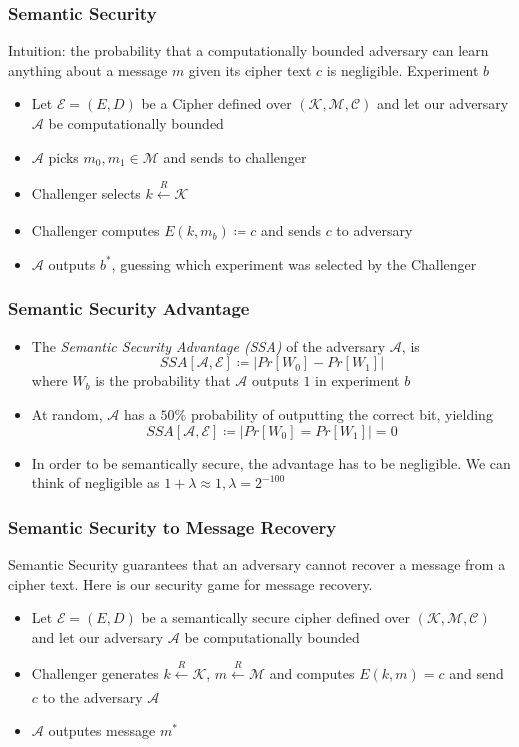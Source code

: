 \documentclass{beamer}
\begin{document}
\begin{frame}
\frametitle{Semantic Security}
    Intuition: the probability that a computationally bounded adversary can learn anything about a message \(m\) given its cipher text \(c\) is negligible. \pause
    Experiment \(b\)
    \begin{itemize}
        \item Let \(\mathcal{E} = (E, D)\) be a Cipher defined over \((\mathcal{K}, \mathcal{M}, \mathcal{C})\) and let our adversary \(\mathcal{A}\) be computationally bounded \pause
        \item \(\mathcal{A}\) picks \(m_0, m_1 \in \mathcal{M}\) and sends to challenger \pause
        \item Challenger selects \(k \xleftarrow[]{R} \mathcal{K}\) \pause
        \item Challenger computes \(E(k, m_b) \coloneqq c \) and sends \(c\) to adversary \pause
        \item \(\mathcal{A}\) outputs \(b^{*}\), guessing which experiment was selected by the Challenger
    \end{itemize}
\end{frame}

\begin{frame}
\frametitle{Semantic Security Advantage}
    \begin{itemize}
        \item The \textit{Semantic Security Advantage (SSA)} of the adversary \(\mathcal{A}\), is \pause \[ SSA[\mathcal{A}, \mathcal{E}] \coloneqq |Pr[W_0] - Pr[W_1]| \] where \(W_b\) is the probability that \(\mathcal{A}\) outputs \(1\) in experiment \(b\) \pause
        \item At random, \(\mathcal{A}\) has a \(50\%\) probability of outputting the correct bit, yielding \[  SSA[\mathcal{A}, \mathcal{E}] \coloneqq |Pr[W_0] = Pr[W_1]| = 0 \] \pause
        \item In order to be semantically secure, the advantage has to be negligible. We can think of negligible as \( 1 + \lambda \approx 1, \lambda = 2^{-100}\) 
    \end{itemize} 
\end{frame}

\begin{frame}
\frametitle{Semantic Security to Message Recovery}
    Semantic Security guarantees that an adversary cannot recover a message from a cipher text. \pause
    Here is our security game for message recovery. \pause
    \begin{itemize}
        \item Let \(\mathcal{E} = (E, D)\) be a semantically secure cipher defined over \((\mathcal{K}, \mathcal{M}, \mathcal{C})\) and let our adversary \(\mathcal{A}\) be computationally bounded \pause
        \item Challenger generates \(k \xleftarrow[]{R} \mathcal{K}\), \(m \xleftarrow[]{R} \mathcal{M}\) and computes \(E(k, m) = c\) and send \(c\) to the adversary \(\mathcal{A}\) \pause
        \item \(\mathcal{A}\) outputes message \(m^{*}\) 
    \end{itemize} 
\end{frame}
\end{document}
